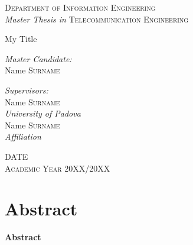 \documentclass[a4paper,11 pt, openright, titlepage]{report}
\makeatletter
\renewenvironment{abstract}{
    \if@twocolumn
      \section*{\abstractname}
    \else 
      \begin{center}
        {\bfseries \Huge\abstractname\vspace{\z@}}
      \end{center}
      \quotation
    \fi}
    {\if@twocolumn\else\endquotation\fi}
\newcommand{\blankpage}{\newpage\shipout\null}
\renewcommand{\abstractname}{Abstract}
\makeatother
\begin{document}
\begin{titlepage}
\begin{center}
\textsc{\LARGE Department of Information Engineering\\[0.3cm]} \textit{\Large Master Thesis in} \textsc{\Large Telecommunication Engineering}\\[0.8cm]
{\Huge \doublespacing \bfseries \begin{spacing}{1}{My Title}\end{spacing}}
\vspace{2.75cm}
\begin{minipage}{0.4\textwidth}
\begin{flushleft} \large
\emph{\slshape Master Candidate:}\\
Name \textsc{Surname}
\end{flushleft}
\end{minipage}
\begin{minipage}{0.5\textwidth}
\begin{flushright} \large
\emph{\slshape Supervisors:}\\ 
Name \textsc{Surname\\}\textit{University of Padova\\[0.15cm]} 
Name \textsc{Surname\\}\textit{Affiliation\\[0.3cm]}
\end{flushright}
\end{minipage}
\vfill

 
\vspace{1.2cm}
\textsc{\large DATE \\ Academic Year 20XX/20XX}

\end{center}

\end{titlepage}

\blankpage

\begin{abstract}

\setcounter{page}{3}


\end{abstract}

\blankpage

	\maketitle 
	\setcounter{page}{6}
	\tableofcontents	
	\listoffigures {}
	 \listoftables {}
	 \printglossaries 
	
\end{document}

